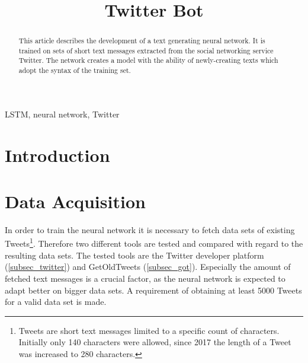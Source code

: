 \documentclass[conference]{IEEEtran}
\begin{document}
\title{Twitter Bot}

\author{
\and
{}
\and
{}
}

\maketitle

\begin{abstract}
This article describes the development of a text generating neural network. It is trained on sets of short text messages extracted from the social networking service Twitter. The network creates a model with the ability of newly-creating texts which adopt the syntax of the training set.
\end{abstract}

\begin{IEEEkeywords}
LSTM, neural network, Twitter
\end{IEEEkeywords}

\section{Introduction}

\section{Data Acquisition}

In order to train the neural network it is necessary to fetch data sets of existing Tweets\footnote{Tweets are short text messages limited to a specific count of characters. Initially only 140 characters were allowed, since 2017 the length of a Tweet was increased to 280 characters.}. Therefore two different tools are tested and compared with regard to the resulting data sets. The tested tools are the Twitter developer platform \cite{twidev} (\ref{subsec_twitter}) and GetOldTweets \cite{got} (\ref{subsec_got}). Especially the amount of fetched text messages  is a crucial factor, as the neural network is expected to adapt better on bigger data sets. A requirement of obtaining at least 5000 Tweets for a valid data set is made.
\end{document}
